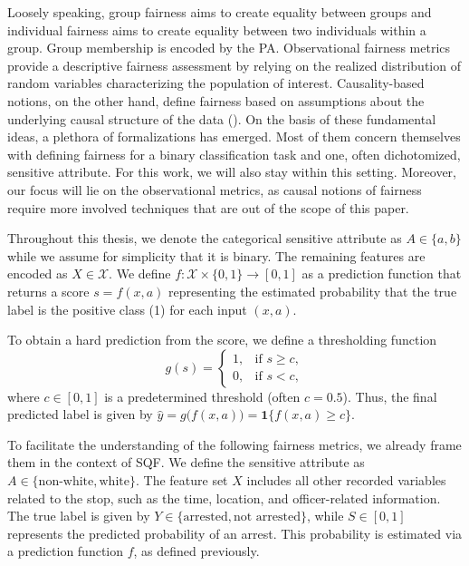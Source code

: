 Loosely speaking, group fairness aims to create equality between groups and individual fairness aims to create equality between two individuals within a group. Group membership is encoded by the PA. Observational fairness metrics provide a descriptive fairness assessment by relying on the realized distribution of random variables characterizing the population of interest. Causality-based notions, on the other hand, define fairness based on assumptions about the underlying causal structure of the data (\cite{castelnovo2022}).
On the basis of these fundamental ideas, a plethora of formalizations has emerged. Most of them concern themselves with defining fairness for a binary classification task and one, often dichotomized, sensitive attribute. For this work, we will also stay within this setting. Moreover, our focus will lie on the observational metrics, as causal notions of fairness require more involved techniques that are out of the scope of this paper.\par
Throughout this thesis, we denote the categorical sensitive attribute as $A \in \{a,b\}$ while we assume for simplicity that it is binary. The remaining features are encoded as $X \in \mathcal{X}$.
We define $f : \mathcal{X} \times \{0,1\} \to [0,1]$ as a prediction function that returns a score \(s = f(x, a)\) representing the estimated probability that the true label is the positive class (1) for each input $(x, a)$.\par
To obtain a hard prediction from the score, we define a thresholding function
$$ g(s) = \begin{cases} 
1, & \text{if } s \ge c, \\
0, & \text{if } s < c,
\end{cases}$$
where \(c \in [0,1]\) is a predetermined threshold (often \(c = 0.5\)).
Thus, the final predicted label is given by $\hat{y} = g\bigl(f(x, a)\bigr) = \mathbf{1}\{f(x, a) \ge c\}$.\par
To facilitate the understanding of the following fairness metrics, we already frame them in the context of SQF. We define the sensitive attribute as \( A \in \{\text{non-white}, \text{white}\} \). The feature set \( X \) includes all other recorded variables related to the stop, such as the time, location, and officer-related information. The true label is given by \( Y \in \{\text{arrested}, \text{not arrested}\} \), while \( S \in [0,1] \) represents the predicted probability of an arrest. This probability is estimated via a prediction function \( f \), as defined previously.

